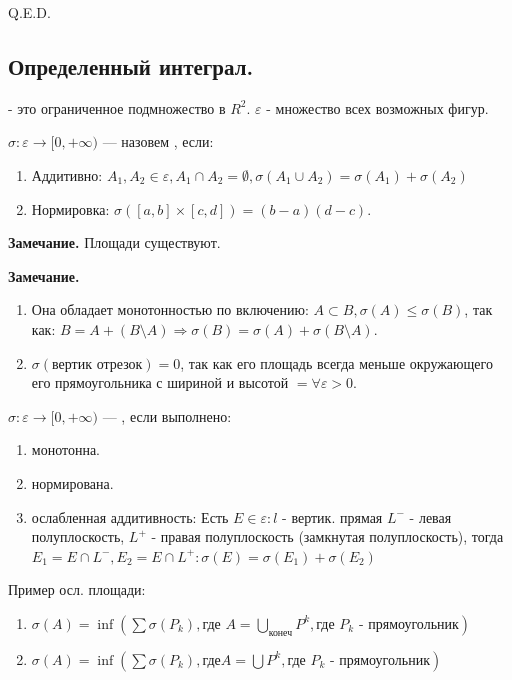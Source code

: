 \hfill Q.E.D.







\pagebreak

\subsection{Определенный интеграл.}


  - это ограниченное подмножество в $R^2$. $\varepsilon$ - множество всех возможных фигур.

$\sigma: \varepsilon \rightarrow [0,+\infty)$ ---  назовем , если:
\begin{enumerate}
    \item Аддитивно: $A_1,A_2 \in \varepsilon, A_1\cap A_2 = \emptyset, \sigma(A_1\cup A_2) = \sigma(A_1)+\sigma(A_2)$
\item Нормировка: $\sigma ([a,b]\times[c,d]) = (b-a)(d-c)$.
\end{enumerate}

\textbf{Замечание.} Площади существуют.

\textbf{Замечание.} \begin{enumerate}
    \item Она обладает монотонностью по включению: $A \subset B, \sigma(A) \leq \sigma(B)$, так как: $B = A + (B \setminus A) \Rightarrow \sigma(B) = \sigma(A) + \sigma(B \setminus A)$.
    \item $\sigma(\text{вертик отрезок})=0$, так как его площадь всегда меньше окружающего его прямоугольника с шириной и высотой $= \forall \varepsilon > 0$.
\end{enumerate}

  $\sigma:\varepsilon\rightarrow [0,+\infty)$ --- , если выполнено:
\begin{enumerate}
    \item монотонна.
    \item нормирована.
    \item ослабленная аддитивность: Есть $E \in \varepsilon: l $ - вертик. прямая $L^-$ - левая полуплоскость, $L^{+}$ - правая полуплоскость (замкнутая полуплоскость), тогда  $E_1 = E\cap L^-, E_2 = E \cap L^+: \sigma(E)=\sigma(E_1)+\sigma(E_2)$
\end{enumerate}

Пример осл. площади:
\begin{enumerate}
    \item $\sigma(A) = \inf (\sum \sigma(P_k), \text{где $A = \bigcup\limits_{\text{конеч}}P^k, \text{где $P_k$ - прямоугольник}$})$ 
    \item $\sigma(A) = \inf (\sum \sigma(P_k), \text{где} A = \bigcup P^k, \text{где $P_k$ - прямоугольник})$
\end{enumerate}

